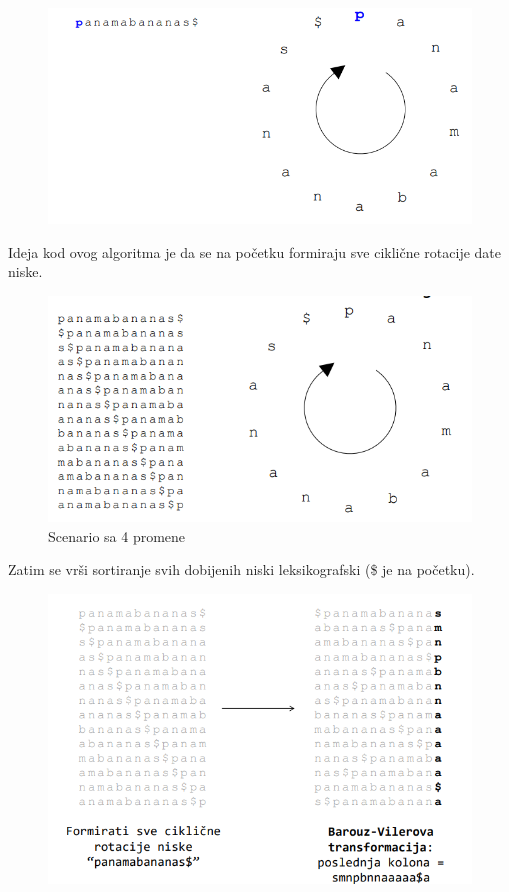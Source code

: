 \begin{figure}[h!]
\centering
\includegraphics[scale=0.6]{poglavlja/9/slike/BWT.png}
\caption{}
\label{slika:X}
\end{figure}

Ideja kod ovog algoritma je da se na početku formiraju sve ciklične rotacije date niske.

\begin{figure}[h!]
\centering
\includegraphics[scale=0.7]{poglavlja/9/slike/SveCiklicneRotacije.png}
\caption{Scenario sa 4 promene}
\label{slika:X}
\end{figure}

Zatim se vrši sortiranje svih dobijenih niski leksikografski (\$ je na početku).

\begin{figure}[h!]
\centering
\includegraphics[scale=0.4]{poglavlja/9/slike/BWTPoslednjaKolona.png}
\caption{}
\label{slika:X}
\end{figure}

